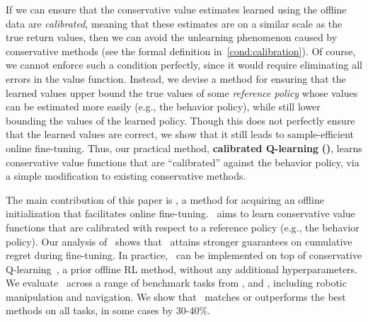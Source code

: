 If we can ensure that the conservative value estimates learned using the offline data are \emph{calibrated}, meaning that these estimates are on a similar scale as the true return values, then we can avoid the unlearning phenomenon caused by conservative methods (see the formal definition in~\ref{cond:calibration}). Of course, we cannot enforce such a condition perfectly, since it would require eliminating all errors in the value function. Instead, we devise a method for ensuring that the learned values upper bound the true values of some \emph{reference policy} whose values can be estimated more easily (e.g., the behavior policy), while still lower bounding the values of the learned policy. Though this does not perfectly ensure that the learned values are correct, we show that it still leads to sample-efficient online fine-tuning. Thus, our practical method, \textbf{calibrated Q-learning} \textbf{(\methodname)}, learns conservative value functions that are ``calibrated'' against the behavior policy, via a simple modification to existing conservative methods.

The main contribution of this paper is \methodname, a method for acquiring an offline initialization that facilitates online fine-tuning. \methodname\ aims to learn conservative value functions that are calibrated with respect to a reference policy (e.g., the behavior policy). Our analysis of \methodname\ shows that \methodname\ attains stronger guarantees on cumulative regret during fine-tuning. In practice, \methodname\ can be implemented on top of conservative Q-learning~\cite{kumar2020conservative}, a prior offline RL method, without any additional hyperparameters. We evaluate \methodname\ across a range of benchmark tasks from \cite{fu2020d4rl}, \cite{singh2020cog} and \cite{AWAC}, including robotic manipulation and navigation. We show that \methodname\ matches or outperforms the best methods on all tasks, in some cases by 30-40\%.


